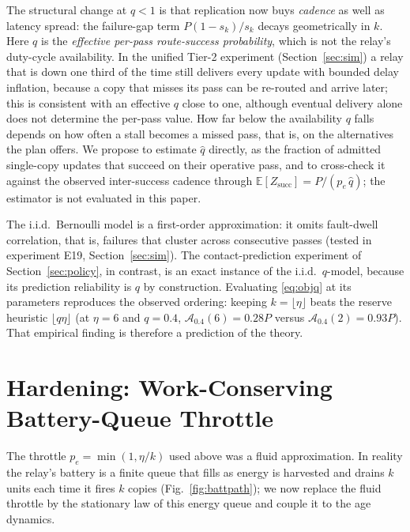 \documentclass[twocolumn,3p,times,procedia]{elsarticle}
\theoremstyle{plain}
\theoremstyle{remark}
\newcommand{\E}{\mathbb{E}}
\newcommand{\peff}{p_e}
\begin{document}
The structural change at $q<1$ is that replication now buys
\emph{cadence} as well as latency spread: the failure-gap term
$P(1-s_k)/s_k$ decays geometrically in $k$. Here $q$ is the
\emph{effective per-pass route-success probability}, which is not the
relay's duty-cycle availability. In the unified Tier-2 experiment
(Section~\ref{sec:sim}) a relay that is down one third of the time
still delivers every update with bounded delay inflation, because a
copy that misses its pass can be re-routed and arrive later; this is
consistent with an effective $q$ close to one, although eventual
delivery alone does not determine the per-pass value. How far below the
availability $q$ falls depends on how often a stall becomes a missed
pass, that is, on the alternatives the plan offers. We propose to
estimate $\hat q$ directly, as the fraction of admitted single-copy
updates that succeed on their operative pass, and to cross-check it
against the observed inter-success cadence through
$\E[Z_{\mathrm{succ}}]=P/(\peff\,\hat q)$; the estimator is not
evaluated in this paper.

The i.i.d.\ Bernoulli model is a first-order approximation: it omits
fault-dwell correlation, that is, failures that cluster across
consecutive passes (tested in experiment E19, Section~\ref{sec:sim}).
The contact-prediction experiment of Section~\ref{sec:policy}, in
contrast, is an exact instance of the i.i.d.\ $q$-model, because its
prediction reliability is $q$ by construction. Evaluating
\eqref{eq:objq} at its parameters reproduces the observed ordering:
keeping $k{=}\lfloor\eta\rfloor$ beats the reserve heuristic
$\lfloor q\eta\rfloor$ (at $\eta{=}6$ and $q{=}0.4$,
$\mathcal{A}_{0.4}(6)=0.28P$ versus $\mathcal{A}_{0.4}(2)=0.93P$). That
empirical finding is therefore a prediction of the theory.

\section{Hardening: Work-Conserving Battery-Queue Throttle}\label{sec:r3hard}
The throttle $\peff=\min(1,\eta/k)$ used above was a fluid approximation.
In reality the relay's battery is a finite queue that fills as energy is
harvested and drains $k$ units each time it fires $k$ copies
(Fig.~\ref{fig:battpath}); we now
replace the fluid throttle by the stationary law of this energy queue and
couple it to the age dynamics.
\end{document}
